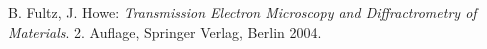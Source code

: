 \documentclass[a4paper, parskip=half, 12pt, bibliography=totocnumbered]{scrartcl}
\begin{document}





\begin{thebibliography}{10}
 B. Fultz, J. Howe: \emph{Transmission Electron Microscopy and Diffractrometry of Materials}. 2. Auflage, Springer Verlag, Berlin 2004.

\end{thebibliography}
\end{document}
